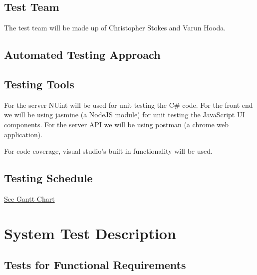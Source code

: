 \documentclass[12pt, titlepage]{article}
\begin{document}
\subsection{Test Team}
The test team will be made up of Christopher Stokes and Varun Hooda.

\subsection{Automated Testing Approach}

\subsection{Testing Tools}
For the server NUint will be used for unit testing the C\# code.
For the front end we will be using jasmine (a NodeJS module) for unit testing
the JavaScript UI components.
For the server API we will be using postman (a chrome web application).

For code coverage, visual studio's built in functionality will be used.

\subsection{Testing Schedule}
		
\href{../ProjectSchedule/schedule.png}{See Gantt Chart}

\section{System Test Description}
	
\subsection{Tests for Functional Requirements}
\end{document}
